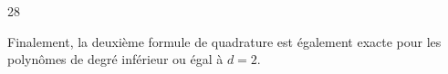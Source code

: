 \begin{reponse}{28}
    \vspace{0.8em}

    Finalement, la deuxième formule de quadrature est également exacte pour les polynômes de degré inférieur ou égal à $d=2$.
    
\end{reponse}